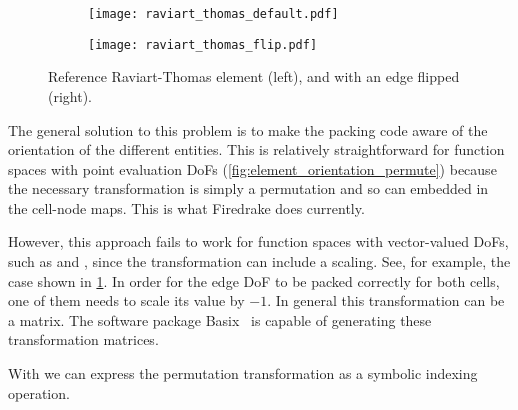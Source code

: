 \documentclass[thesis]{subfiles}
\begin{document}
\begin{figure}
  \centering
  \begin{subfigure}{0.45\textwidth}
    \centering
    \texttt{[image: raviart\_thomas\_default.pdf]}
  \end{subfigure}
  \begin{subfigure}{0.45\textwidth}
    \centering
    \texttt{[image: raviart\_thomas\_flip.pdf]}
  \end{subfigure}
  \caption{Reference Raviart-Thomas element (left), and with an edge flipped (right).}
  \label{fig:element_orientation_flip}
\end{figure}

The general solution to this problem is to make the packing code aware of the orientation of the different entities.
This is relatively straightforward for function spaces with point evaluation DoFs (\cref{fig:element_orientation_permute}) because the necessary transformation is simply a permutation and so can embedded in the cell-node maps.
This is what Firedrake does currently.

However, this approach fails to work for function spaces with vector-valued DoFs, such as \hdiv and \hcurl, since the transformation can include a scaling.
See, for example, the case shown in \cref{fig:element_orientation_flip}.
In order for the edge DoF to be packed correctly for both cells, one of them needs to scale its value by $-1$.
In general this transformation can be a matrix.
The software package Basix~\cite{scroggsBasixRuntimeFinite2022,scroggsConstructionArbitraryOrder2021} is capable of generating these transformation matrices.

With  we can express the permutation transformation as a symbolic indexing operation.









\end{document}

